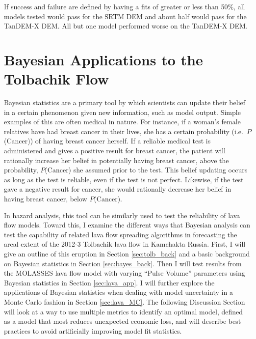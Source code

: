 \documentclass[12pt,letter]{article}
\begin{document}
		If success and failure are defined by having a fits of greater or less than 50\%, all models tested would pass for the SRTM DEM and about half would pass for the TanDEM-X DEM. All but one model performed worse on the TanDEM-X DEM.


\section{Bayesian Applications to the Tolbachik Flow}\label{sec:Bayesian}
	Bayesian statistics are a primary tool by which scientists can update their belief in a certain phenomenon given new information, such as model output. Simple examples of this are often medical in nature. For instance, if a woman's female relatives have had breast cancer in their lives, she has a certain probability (i.e.~$P$(Cancer)) of having breast cancer herself. If a reliable medical test is administered and gives a positive result for breast cancer, the patient will rationally increase her belief in potentially having breast cancer, above the probability, $P$(Cancer) she assumed prior to the test. This belief updating occurs as long as the test is reliable, even if the test is not perfect. Likewise, if the test gave a negative result for cancer, she would rationally decrease her belief in having breast cancer, below $P$(Cancer).

	In hazard analysis, this tool can be similarly used to test the reliability of lava flow models. Toward this, I examine the different ways that Bayesian analysis can test the capability of related lava flow spreading algorithms in forecasting the areal extent of the 2012-3 Tolbachik lava flow in Kamchakta Russia. First, I will give an outline of this eruption in Section \ref{sec:tolb_back} and a basic background on Bayesian statistics in Section \ref{sec:bayes_back}. Then I will test results from the MOLASSES lava flow model with varying ``Pulse Volume'' parameters using Bayesian statistics in Section \ref{sec:lava_app}. I will further explore the applications of Bayesian statistics when dealing with model uncertainty in a Monte Carlo fashion in Section \ref{sec:lava_MC}. The following Discussion Section will look at a way to use multiple metrics to identify an optimal model, defined as a model that most reduces unexpected economic loss, and will describe best practices to avoid artificially improving model fit statistics.
\end{document}
